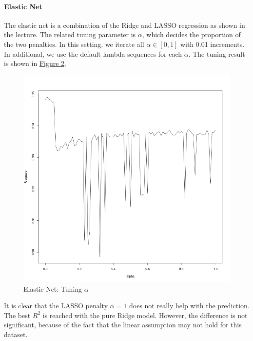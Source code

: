 \documentclass{article}
\begin{document}
\paragraph{Elastic Net}
The elastic net is a combination of the Ridge and LASSO regression as shown in the lecture. 
The related tuning parameter is $\alpha$, which decides the proportion of the two penalties. 
In this setting, we iterate all $\alpha \in [0, 1]$ with 0.01 increments. 
In additional, we use the default lambda sequences for each $\alpha$. 
The tuning result is shown in \hyperref[fig:elastic_net]{Figure 2}.
\begin{figure}[H]
    \centering
    \includegraphics*[scale=0.25]{figures/elastic_net.png}
    \caption{Elastic Net: Tuning $\alpha$}
    \label{fig:elastic_net}
\end{figure}
It is clear that the LASSO penalty $\alpha = 1$ does not really help with the prediction.
The best $R^2$ is reached with the pure Ridge model. However, the difference is not significant, 
because of the fact that the linear assumption may not hold for this dataset.
\end{document}
